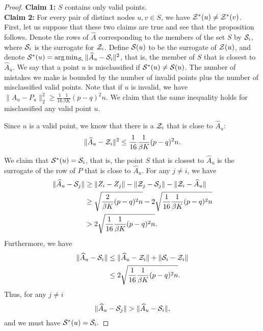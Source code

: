 \documentclass{article}
\begin{document}
\begin{proof}
\noindent \textbf{Claim 1:} $S$ contains only valid points. \\
\textbf{Claim 2:} For every pair of distinct nodes $u,v \in S$, we have ${\cal Z}^*(u) \neq {\cal Z}^*(v)$. \\

First, let us suppose that these two claims are true and see that the proposition follows. Denote the rows of $\hat A$ corresponding to the members of the set $S$ by ${\cal S}_i$, where ${\cal S}_i$ is the surrogate for ${\cal  Z}_i$. Define ${\cal S}(u)$ to be the surrogate of ${\cal Z}(u)$, and denote ${\cal S}^*(u) =\arg\min_{{\cal S}_i} \| \hat A_u - {\cal S}_i \|^2$, that is, the member of $S$ that is closest to $\hat A_u$. We say that a point $u$ is misclassified if ${\cal S}^*(u) \neq {\cal S}(u)$. The number of mistakes we make is bounded by the number of invalid points plus the number of misclassified valid points. Note that if $u$ is invalid, we have $\|\hat{A}_u - P_u\|_2^2 \ge \frac{1}{16} \frac{1}{\beta K} (p-q)^2n$. We claim that the same inequality holds for misclassified any valid point $u$. 


Since $u$ is a valid point, we know that there is a ${\cal Z}_i$ that is close to $\hat A_u$:
$$ \| \hat A_u - {\cal Z}_i \|^2 \leq \frac{1}{16}\frac{1}{\beta K} (p-q)^2 n.$$
We claim that ${\cal S}^*(u) = {\cal S}_i$, that is, the point $S$ that is closest to $\hat A_u$ is the surrogate of the row of $P$ that is close to $\hat A_u$. For any $j \neq i$, we have
\begin{align*}
\| \hat A_u - {\cal S}_j \| &\geq \|Z_i - Z_j \| - \|{\cal Z}_j - {\cal S}_j \| - \|{\cal Z}_i - \hat A_u\|\\
&\geq \sqrt{\frac{2}{\beta K} (p-q)^2 n} - 2\sqrt{\frac{1}{16}\frac{1}{\beta K} (p-q)^2 n}\\
&> 2\sqrt{\frac{1}{16}\frac{1}{\beta K} (p-q)^2 n}.
\end{align*}
Furthermore, we have
\begin{align*}
\| \hat A_u - {\cal S}_i \| &\leq \| \hat A_u - {\cal Z}_i \| + \| {\cal S}_i - {\cal Z}_i \|\\
&\leq 2 \sqrt{\frac{1}{16}\frac{1}{\beta K} (p-q)^2 n}.
\end{align*}
Thus, for any $j \neq i$
\begin{align*}
\| \hat A_u - {\cal S}_j \|  > \| \hat A_u - {\cal S}_i \|,
\end{align*}
and we must have ${\cal S}^*(u) = {\cal S}_i.$


\end{proof}
\end{document}
